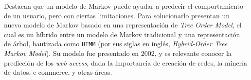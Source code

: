 Destacan que un modelo de Markov puede ayudar a predecir el comportamiento de un usuario, pero con ciertas limitaciones. Para solucionarlo presentan un nuevo modelo de Markov basado en una representación de \emph{Tree Order Model}, el cual es un híbrido entre un modelo de Markov tradicional y una representación de árbol, bautizada como \texttt{HTMM} (por sus siglas en inglés, \emph{Hybrid-Order Tree Markov Model}).
Su modelo fue presentado en 2002, y es relevante conocer la predicción de los \emph{web access}, dada la importancia de creación de redes, la minería de datos, e-commerce, y otras áreas.
